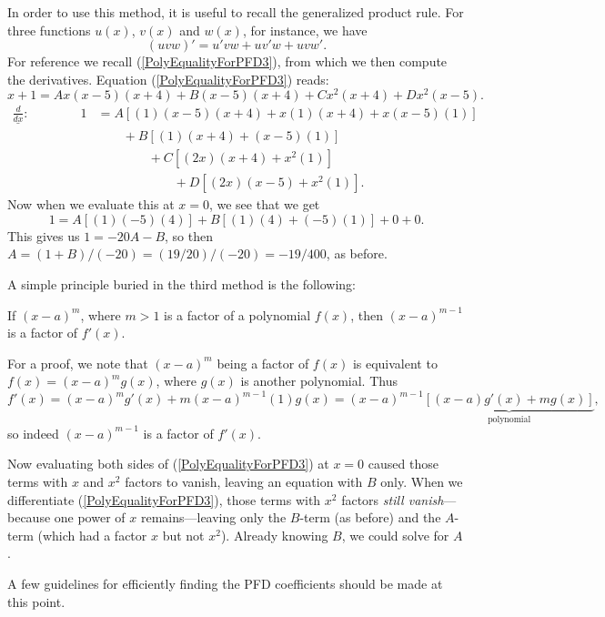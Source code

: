 \begin{description}
In order to use this method, it is useful to recall the generalized
product rule.  For three functions $u(x)$, $v(x)$ and $w(x)$, for instance,
we have
$$(uvw)'=u'vw+uv'w+uvw'.$$
For reference we recall (\ref{PolyEqualityForPFD3}), from which we then
compute the derivatives. Equation (\ref{PolyEqualityForPFD3}) reads:
$$x+1=Ax(x-5)(x+4)+B(x-5)(x+4)+Cx^2(x+4)+Dx^2(x-5).$$
\begin{align*}
\underline{\frac{d}{dx}}:\qquad\qquad1&=A[(1)(x-5)(x+4)+x(1)(x+4)+x(x-5)(1)]\\
  &\qquad+B[(1)(x+4)+(x-5)(1)]\\
  &\qquad\qquad+C[(2x)(x+4)+x^2(1)]\\
  &\qquad\qquad\qquad+D[(2x)(x-5)+x^2(1)].\end{align*}
Now when we evaluate this at $x=0$, we see that we get
$$1=A[(1)(-5)(4)]+B[(1)(4)+(-5)(1)]+0+0.$$
This gives us $1=-20A-B$, so then $A=(1+B)/(-20)=(19/20)/(-20)=-19/400$,
as before.
\end{description}
\eex

A simple principle buried in the third method is the following:
\begin{theorem}
If $(x-a)^m$, where $m>1$ is a factor of a polynomial $f(x)$,
             then $(x-a)^{m-1}$ is a factor of $f'(x)$.
\label{DerivLowersPowerOf(X-A)Theorem} 
\end{theorem}
For a proof, we note that $(x-a)^m$ being a factor of $f(x)$
is equivalent to $f(x)=(x-a)^mg(x)$, where $g(x)$ is another 
polynomial.  Thus
$$f'(x)=(x-a)^mg'(x)+m(x-a)^{m-1}(1)g(x)
=(x-a)^{m-1}\underbrace{\left[(x-a)g'(x)+mg(x)\right]}_{\text{polynomial}},$$
so indeed $(x-a)^{m-1}$ is a factor of $f'(x)$.


Now evaluating both sides of (\ref{PolyEqualityForPFD3}) at $x=0$
caused  those terms with $x$ and $x^2$ factors to vanish,
leaving an equation with $B$ only.  When we differentiate 
(\ref{PolyEqualityForPFD3}), those terms with $x^2$ factors
{\it still vanish}---because one power of $x$ remains---leaving 
only the $B$-term (as before) 
and the $A$-term (which had a factor $x$ but not $x^2$).
Already knowing $B$, we could solve for $A$.


A few guidelines for efficiently finding the PFD coefficients
should be made at this point.

